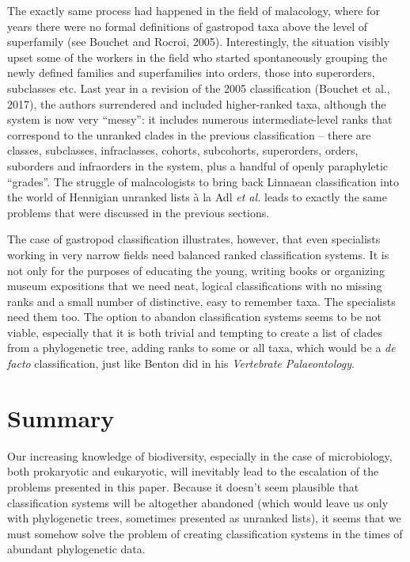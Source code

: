 \begin{artengenv}
The exactly same process had happened in the field of malacology, where for years there were no formal definitions of
gastropod taxa above the level of superfamily \label{ref:RND5saL769IKK}(see Bouchet and Rocroi, 2005). Interestingly,
the situation visibly upset some of the workers in the field who started spontaneously grouping the newly defined
families and superfamilies into orders, those into superorders, subclasses etc. Last year in a revision of the 2005
classification \label{ref:RNDSnxh8fRQNP}(Bouchet et al., 2017), the authors surrendered and included higher-ranked
taxa, although the system is now very “messy”: it includes numerous intermediate-level ranks that correspond to the
unranked clades in the previous classification – there are classes, subclasses, infraclasses, cohorts, subcohorts,
superorders, orders, suborders and infraorders in the system, plus a handful of openly paraphyletic “grades”. The
struggle of malacologists to bring back Linnaean classification into the world of Hennigian unranked lists à la Adl
\textit{et al.} leads to exactly the same problems that were discussed in the previous sections.

The case of gastropod classification illustrates, however, that even specialists working in very narrow fields need
balanced ranked classification systems. It is not only for the purposes of educating the young, writing books or
organizing museum expositions that we need neat, logical classifications with no missing ranks and a small number of
distinctive, easy to remember taxa. The specialists need them too. The option to abandon classification systems seems
to be not viable, especially that it is both trivial and tempting to create a list of clades from a phylogenetic tree,
adding ranks to some or all taxa, which would be a \textit{de facto} classification, just like Benton did in his
\textit{Vertebrate Palaeontology}.

\section{Summary}

Our increasing knowledge of biodiversity, especially in the case of microbiology, both prokaryotic and eukaryotic, will
inevitably lead to the escalation of the problems presented in this paper. Because it doesn’t seem plausible that
classification systems will be altogether abandoned (which would leave us only with phylogenetic trees, sometimes
presented as unranked lists), it seems that we must somehow solve the problem of creating classification systems in the
times of abundant phylogenetic data.


\end{artengenv}
